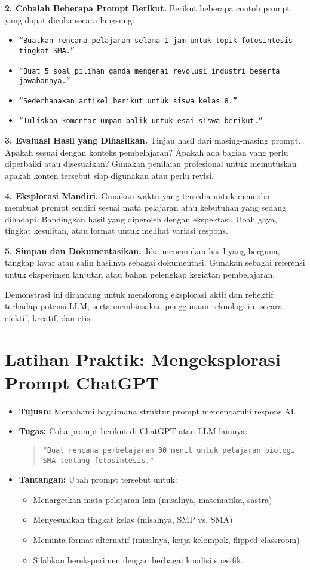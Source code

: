 \textbf{2. Cobalah Beberapa Prompt Berikut.} Berikut beberapa contoh prompt yang dapat dicoba secara langsung:
\begin{itemize}
	\item \texttt{“Buatkan rencana pelajaran selama 1 jam untuk topik fotosintesis ting\-kat SMA.”}
	\item \texttt{“Buat 5 soal pilihan ganda mengenai revolusi industri be\-ser\-ta ja\-wab\-an\-nya\-.”}
	\item \texttt{“Sederhanakan artikel berikut untuk siswa kelas 8.”}
	\item \texttt{“Tuliskan komentar umpan balik untuk esai siswa berikut.”}
\end{itemize}


\textbf{3. Evaluasi Hasil yang Dihasilkan.} Tinjau hasil dari masing-masing prompt. Apakah sesuai dengan konteks pembelajaran? Apakah ada bagian yang perlu diperbaiki atau disesuaikan? Gunakan penilaian profesional untuk memutuskan apakah konten tersebut siap digunakan atau perlu revisi.


\textbf{4. Eksplorasi Mandiri.} Gunakan waktu yang tersedia untuk mencoba membuat prompt sendiri sesuai mata pelajaran atau kebutuhan yang sedang dihadapi. Bandingkan hasil yang diperoleh dengan ekspektasi. Ubah gaya, tingkat kesulitan, atau format untuk melihat variasi respons.


\textbf{5. Simpan dan Dokumentasikan.} Jika menemukan hasil yang berguna, tangkap layar atau salin hasilnya sebagai dokumentasi. Gunakan sebagai referensi untuk eksperimen lanjutan atau bahan pelengkap kegiatan pembelajaran.


Demonstrasi ini dirancang untuk mendorong eksplorasi aktif dan reflektif terhadap potensi LLM, serta membiasakan penggunaan teknologi ini secara efektif, kreatif, dan etis.


\section*{Latihan Praktik: Mengeksplorasi Prompt ChatGPT}
\begin{itemize}
	\item \textbf{Tujuan:} Memahami bagaimana struktur prompt memengaruhi respons AI.
	\item \textbf{Tugas:} Coba prompt berikut di ChatGPT atau LLM lainnya:  
	\begin{quote}
		\texttt{"Buat rencana pembelajaran 30 menit untuk pelajaran biologi SMA tentang fotosintesis."}
	\end{quote}
	\item \textbf{Tantangan:} Ubah prompt tersebut untuk:
	\begin{itemize}
		\item Menargetkan mata pelajaran lain (misalnya, matematika, sastra)
		\item Menyesuaikan tingkat kelas (misalnya, SMP vs. SMA)
		\item Meminta format alternatif (misalnya, kerja kelompok, flipped classroom)
		\item Silahkan bereksperimen dengan berbagai kondisi spesifik.
	\end{itemize}
\end{itemize}
